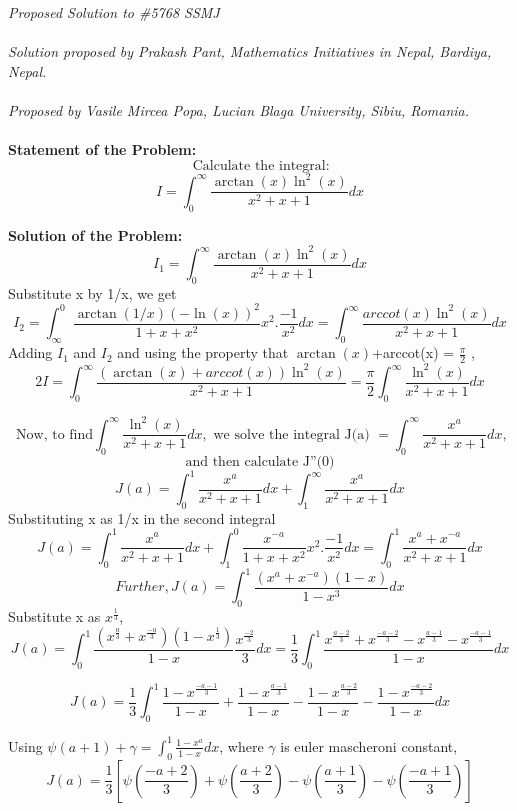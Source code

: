 \documentclass[12pt]{article}
\begin{document}
\textit{Proposed Solution to \#5768 SSMJ }\\ \\
\textit{Solution proposed by Prakash Pant, Mathematics Initiatives in Nepal, Bardiya, Nepal.}\\ \\
\textit{Proposed by Vasile Mircea Popa, Lucian Blaga University, Sibiu, Romania.} \\ \\
\textbf{Statement of the Problem:}
\[ \text{ Calculate the integral} : \]
\[ I = \int_0^{\infty} \frac{\arctan(x) \ln^2(x)}{x^2+x+1} dx\]

\textbf{Solution of the Problem:}
\[ I_1 = \int_0^{\infty} \frac{\arctan(x) \ln^2(x)}{x^2+x+1} dx\]
Substitute x by 1/x, we get
\[ I_2 = \int_{\infty}^{0} \frac{ \arctan(1/x) (-\ln(x))^2}{1+x+x^2}x^2 . \frac{-1}{x^2} dx = \int_0^{\infty} \frac{arccot(x) \ln^2(x)}{x^2+x+1} dx \]
Adding $I_1$ and $I_2$ and using the property that $\arctan(x)$+arccot(x) = $\frac{\pi}{2}$ ,
\[ 2I = \int_0^{\infty} \frac{(\arctan(x)+ arccot(x)) \ln^2(x)}{x^2+x+1} =\frac{\pi}{2} \int_0^{\infty} \frac{ \ln^2(x)}{x^2+x+1}  dx\]

\[ \text{ Now, to find}  \int_0^{\infty} \frac{ \ln^2(x)}{x^2+x+1}  dx , \text{ we solve the integral J(a) }= \int_0^{\infty} \frac{x^a}{x^2+x+1}dx ,\]\[ \text{ and then calculate  J''(0) }\] 
\[ J(a) =  \int_0^1 \frac{x^a}{x^2+x+1}dx + \int_1^{\infty} \frac{x^a}{x^2+x+1}dx  \]
Substituting x as 1/x in the second integral 
\[ J(a) =  \int_0^1 \frac{x^a}{x^2+x+1}dx + \int_1^0 \frac{x^{-a}}{1+x+x^2}x^2 . \frac{-1}{x^2} dx =  \int_0^1 \frac{x^a + x^{-a}}{x^2+x+1}dx  \]
\[ Further, J(a) =  \int_0^1 \frac{(x^a + x^{-a})(1-x)}{1-x^3}dx \]
Substitute x as $x^{\frac{1}{3}}$,
\[  J(a) =  \int_0^1 \frac{(x^{\frac{a}{3}} + x^{\frac{-a}{3}})(1-x^{\frac{1}{3}})}{1-x} \frac{x^{\frac{-2}{3}}}{3} dx  = \frac{1}{3} \int_0^1 \frac{ x^{\frac{a-2}{3}} + x^{\frac{-a-2}{3}} - x^{\frac{a-1}{3}} - x^{\frac{-a-1}{3}}  }{1-x}  dx \]

\[  J(a) = \frac{1}{3} \int_0^1 \frac{1- x^{\frac{-a-1}{3}} }{1-x} + \frac{1- x^{\frac{a-1}{3}}}{1-x} - \frac{1- x^{\frac{a-2}{3}} }{1-x}- \frac{1- x^{\frac{-a-2}{3}} }{1-x}   dx \]

Using $ \psi (a+1) + \gamma = \int_0^1 \frac{1-x^a}{1-x} dx $, where $\gamma$ is euler mascheroni constant, 
\[  J(a) = \frac{1}{3} \left[   \psi\left( \frac{-a+2}{3} \right) + \psi \left( \frac{a+2}{3} \right) - \psi\left( \frac{a+1}{3} \right) - \psi \left( \frac{-a+1}{3} \right)   \right] \]
\end{document}
